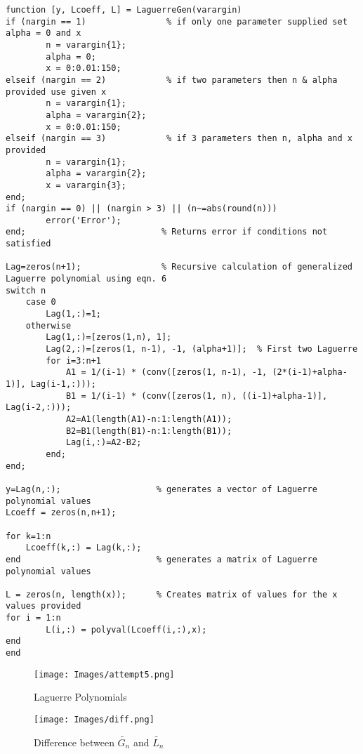 \documentclass{article}
\begin{document}
\begin{lstlisting}
function [y, Lcoeff, L] = LaguerreGen(varargin)
if (nargin == 1)                % if only one parameter supplied set alpha = 0 and x
        n = varargin{1};
        alpha = 0;
        x = 0:0.01:150;      
elseif (nargin == 2)            % if two parameters then n & alpha provided use given x
        n = varargin{1};
        alpha = varargin{2};
        x = 0:0.01:150;
elseif (nargin == 3)            % if 3 parameters then n, alpha and x provided
        n = varargin{1};
        alpha = varargin{2};
        x = varargin{3};
end;
if (nargin == 0) || (nargin > 3) || (n~=abs(round(n))) 
        error('Error');   
end;                           % Returns error if conditions not satisfied

Lag=zeros(n+1);                % Recursive calculation of generalized Laguerre polynomial using eqn. 6
switch n
    case 0
        Lag(1,:)=1;
    otherwise           
        Lag(1,:)=[zeros(1,n), 1];
        Lag(2,:)=[zeros(1, n-1), -1, (alpha+1)];  % First two Laguerre
        for i=3:n+1
            A1 = 1/(i-1) * (conv([zeros(1, n-1), -1, (2*(i-1)+alpha-1)], Lag(i-1,:)));
            B1 = 1/(i-1) * (conv([zeros(1, n), ((i-1)+alpha-1)], Lag(i-2,:)));
            A2=A1(length(A1)-n:1:length(A1));
            B2=B1(length(B1)-n:1:length(B1));
            Lag(i,:)=A2-B2;    
        end;
end;   

y=Lag(n,:);                   % generates a vector of Laguerre polynomial values
Lcoeff = zeros(n,n+1);

for k=1:n
    Lcoeff(k,:) = Lag(k,:);
end                           % generates a matrix of Laguerre polynomial values

L = zeros(n, length(x));      % Creates matrix of values for the x values provided
for i = 1:n          
        L(i,:) = polyval(Lcoeff(i,:),x);
end
end\end{lstlisting}



\begin{figure}[h]
\centering
	\begin{minipage}[c][][b]{0.45\linewidth}
		\begin{center}
		\texttt{[image: Images/attempt5.png]}  
		\end{center}
		\caption[b]{Laguerre Polynomials}
		\label{fourierapproximationtriangle}
	\end{minipage}
\quad\quad\quad\quad
	\begin{minipage}[c][][b]{0.45\linewidth}
		\begin{center}
		\texttt{[image: Images/diff.png]}
		\end{center}
		\caption[b]{Difference between $\tilde{G_n}$ and $\tilde{L_n}$}
		\label{numberoffourierterms}
	\end{minipage}
\end{figure}
\end{document}
